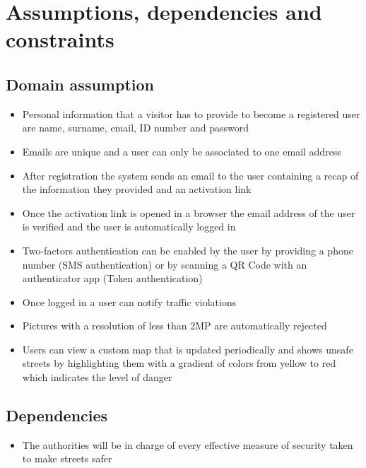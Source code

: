 \section{Assumptions, dependencies and constraints}

\subsection{Domain assumption}
  \begin{itemize}
    \item Personal information that a visitor has to provide to become a registered user are name, surname, email, ID number and password
    \item Emails are unique and a user can only be associated to one email address
    \item After registration the system sends an email to the user containing a recap of the information they provided and an activation link
    \item Once the activation link is opened in a browser the email address of the user is verified and the user is automatically logged in
    \item Two-factors authentication can be enabled by the user by providing a phone number (SMS authentication) or by scanning a QR Code with an authenticator app (Token authentication)
    \item Once logged in a user can notify traffic violations
    \item Pictures with a resolution of less than 2MP are automatically rejected
    \item Users can view a custom map that is updated periodically and shows unsafe streets by highlighting them with a gradient of colors from yellow to red which indicates the level of danger
  \end{itemize}

\subsection{Dependencies}
  \begin{itemize}
    \item The authorities will be in charge of every effective measure of security taken to make streets safer
  \end{itemize}
